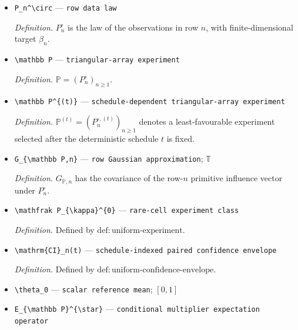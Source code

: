 \documentclass{article}
\begin{document}
\begin{itemize}
  \par\smallskip\noindent\emph{Definition.} Defined by \(\mathrm{def:uniform\text{-}handle}\).
  \item \texttt{P\_\allowbreak{}n\textasciicircum{}\textbackslash{}\allowbreak{}circ} --- \texttt{row data law}
  \par\smallskip\noindent\emph{Definition.} \(P_n^\circ\) is the law of the observations in row \(n\), with finite-dimensional target \(\beta_n\).
  \item \texttt{\textbackslash{}\allowbreak{}mathbb P} --- \texttt{triangular-\allowbreak{}array experiment}
  \par\smallskip\noindent\emph{Definition.} \(\mathbb P=(P_n^\circ)_{n\ge1}\).
  \item \texttt{\textbackslash{}\allowbreak{}mathbb P\textasciicircum{}\{(t)\}\allowbreak{}} --- \texttt{schedule-\allowbreak{}dependent triangular-\allowbreak{}array experiment}
  \par\smallskip\noindent\emph{Definition.} \(\mathbb P^{(t)}=(P_n^{\circ,(t)})_{n\ge1}\) denotes a least-favourable experiment selected after the deterministic schedule \(t\) is fixed.
  \item \texttt{G\_\allowbreak{}\{\textbackslash{}\allowbreak{}mathbb P,\allowbreak{}n\}\allowbreak{}} --- \texttt{row Gaussian approximation}; \(\mathbb T\)
  \par\smallskip\noindent\emph{Definition.} \(G_{\mathbb P,n}\) has the covariance of the row-\(n\) primitive influence vector under \(P_n^\circ\).
  \item \texttt{\textbackslash{}\allowbreak{}mathfrak P\_\allowbreak{}\{\textbackslash{}\allowbreak{}kappa\}\allowbreak{}\textasciicircum{}\{0\}\allowbreak{}} --- \texttt{rare-\allowbreak{}cell experiment class}
  \par\smallskip\noindent\emph{Definition.} Defined by \(\mathrm{def:uniform\text{-}experiment}\).
  \item \texttt{\textbackslash{}\allowbreak{}mathrm\{CI\}\allowbreak{}\_\allowbreak{}n(t)} --- \texttt{schedule-\allowbreak{}indexed paired confidence envelope}
  \par\smallskip\noindent\emph{Definition.} Defined by \(\mathrm{def:uniform\text{-}confidence\text{-}envelope}\).
  \item \texttt{\textbackslash{}\allowbreak{}theta\_\allowbreak{}0} --- \texttt{scalar reference mean}; \([0,1]\)
  \item \texttt{E\_\allowbreak{}\{\textbackslash{}\allowbreak{}mathbb P\}\allowbreak{}\textasciicircum{}\{\textbackslash{}\allowbreak{}star\}\allowbreak{}} --- \texttt{conditional multiplier expectation operator}

\end{itemize}
\end{document}
